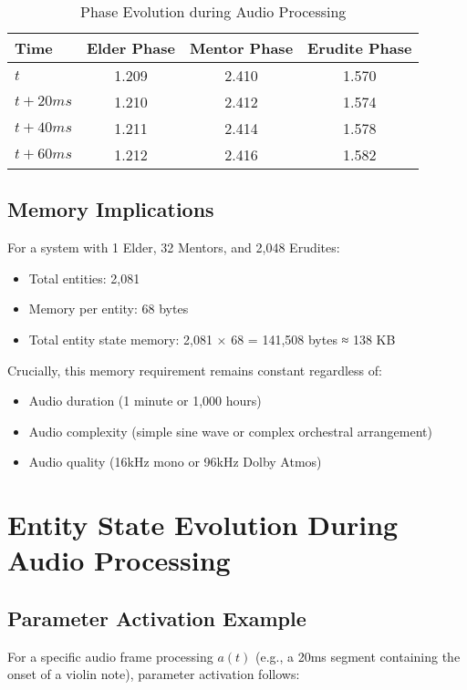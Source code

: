 \begin{table}[h]
\centering
\begin{tabular}{|l|c|c|c|}
\hline
\textbf{Time} & \textbf{Elder Phase} & \textbf{Mentor Phase} & \textbf{Erudite Phase} \\
\hline
$t$ & 1.209 & 2.410 & 1.570 \\
$t + 20ms$ & 1.210 & 2.412 & 1.574 \\
$t + 40ms$ & 1.211 & 2.414 & 1.578 \\
$t + 60ms$ & 1.212 & 2.416 & 1.582 \\
\hline
\end{tabular}
\caption{Phase Evolution during Audio Processing}
\end{table}

\subsection{Memory Implications}

For a system with 1 Elder, 32 Mentors, and 2,048 Erudites:
\begin{itemize}
    \item Total entities: 2,081
    \item Memory per entity: 68 bytes
    \item Total entity state memory: 2,081 × 68 = 141,508 bytes ≈ 138 KB
\end{itemize}

Crucially, this memory requirement remains constant regardless of:
\begin{itemize}
    \item Audio duration (1 minute or 1,000 hours)
    \item Audio complexity (simple sine wave or complex orchestral arrangement)
    \item Audio quality (16kHz mono or 96kHz Dolby Atmos)
\end{itemize}

\section{Entity State Evolution During Audio Processing}

\subsection{Parameter Activation Example}

For a specific audio frame processing $a(t)$ (e.g., a 20ms segment containing the onset of a violin note), parameter activation follows:

